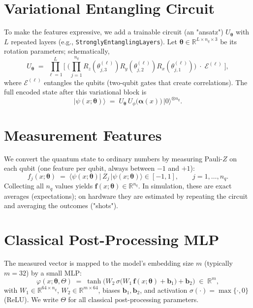\documentclass[11pt]{article}
\begin{document}
\section{Variational Entangling Circuit}

To make the features expressive, we add a trainable circuit (an "ansatz") $U_{\bm{\theta}}$ with $L$ repeated layers (e.g., \texttt{StronglyEntanglingLayers}). Let $\bm{\theta}\in\mathbb{R}^{L\times n_q\times 3}$ be its rotation parameters; schematically,
\begin{equation}
\label{eq:sel}
U_{\bm{\theta}}\;=\;\prod_{\ell=1}^{L}\Bigg[\;\Big(\prod_{j=1}^{n_q} R_z(\theta^{(\ell)}_{j,3}) R_y(\theta^{(\ell)}_{j,2}) R_x(\theta^{(\ell)}_{j,1})\Big)\;\cdot\;\mathcal{E}^{(\ell)}\;\Bigg],
\end{equation}
where $\mathcal{E}^{(\ell)}$ entangles the qubits (two-qubit gates that create correlations). The full encoded state after this variational block is
\begin{equation}
\label{eq:full-state}
\lvert\psi(x;\bm{\theta})\rangle\;=\;U_{\bm{\theta}}\,U_\phi\big(\bm{\alpha}(x)\big)\,\lvert 0\rangle^{\otimes n_q}.
\end{equation}

\section{Measurement Features}

We convert the quantum state to ordinary numbers by measuring Pauli-$Z$ on each qubit (one feature per qubit, always between $-1$ and $+1$):
\begin{equation}
\label{eq:meas}
f_j(x;\bm{\theta}) \;=\; \langle\psi(x;\bm{\theta})\rvert\, Z_j\, \lvert\psi(x;\bm{\theta})\rangle \in [-1,1],\qquad j=1,\dots,n_q.
\end{equation}
Collecting all $n_q$ values yields $\bm{f}(x;\bm{\theta})\in\mathbb{R}^{n_q}$. In simulation, these are exact averages (expectations); on hardware they are estimated by repeating the circuit and averaging the outcomes ("shots").

\section{Classical Post-Processing MLP}

The measured vector is mapped to the model’s embedding size $m$ (typically $m=32$) by a small MLP:
\begin{equation}
\label{eq:mlp}
\varphi(x;\bm{\theta},\Theta)\;=\;\tanh\!\Big( W_2\,\sigma\big(W_1\,\bm{f}(x;\bm{\theta})+\bm{b}_1\big)+\bm{b}_2 \Big)\;\in\;\mathbb{R}^{m},
\end{equation}
with $W_1\in\mathbb{R}^{64\times n_q}$, $W_2\in\mathbb{R}^{m\times 64}$, biases $\bm{b}_1,\bm{b}_2$, and activation $\sigma(\cdot)=\max\{\cdot,0\}$ (ReLU). We write $\Theta$ for all classical post-processing parameters.
\end{document}
